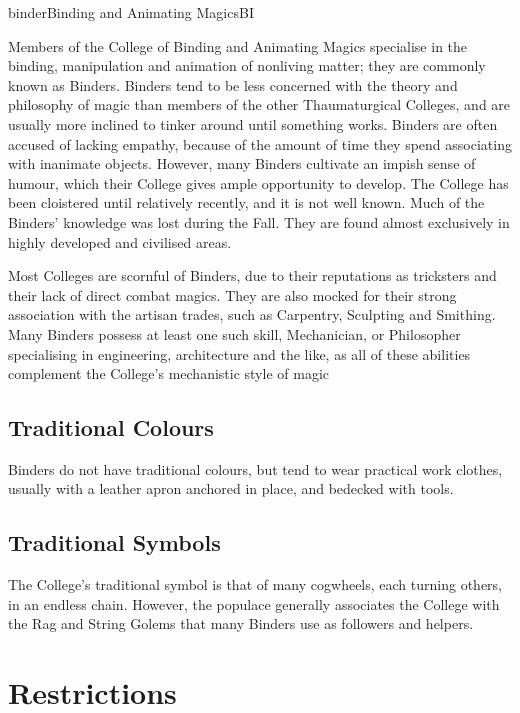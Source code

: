 \begin{College}[1.2]{binder}{Binding and Animating Magics}{BI}

Members of the College of Binding and Animating Magics specialise in
the binding, manipulation and animation of nonliving matter; they are
commonly known as Binders.  Binders tend to be less concerned with the
theory and philosophy of magic than members of the other
Thaumaturgical Colleges, and are usually more inclined to tinker
around until something works.  Binders are often accused of lacking
empathy, because of the amount of time they spend associating with
inanimate objects.  However, many Binders cultivate an impish sense of
humour, which their College gives ample opportunity to develop.  The
College has been cloistered until relatively recently, and it is not
well known.  Much of the Binders’ knowledge was lost during the Fall.
They are found almost exclusively in highly developed and civilised
areas.

Most Colleges are scornful of Binders, due to their reputations as
tricksters and their lack of direct combat magics.  They are also
mocked for their strong association with the artisan trades, such as
Carpentry, Sculpting and Smithing.  Many Binders possess at least one
such skill, Mechanician, or Philosopher specialising in engineering,
architecture and the like, as all of these abilities complement the
College’s mechanistic style of magic

\subsection{Traditional Colours}

Binders do not have traditional colours, but tend to wear practical
work clothes, usually with a leather apron anchored in place, and
bedecked with tools.

\subsection{Traditional Symbols}

The College’s traditional symbol is that of many cogwheels, each
turning others, in an endless chain.  However, the populace generally
associates the College with the Rag and String Golems that many
Binders use as followers and helpers.

\section{Restrictions}


\end{College}
